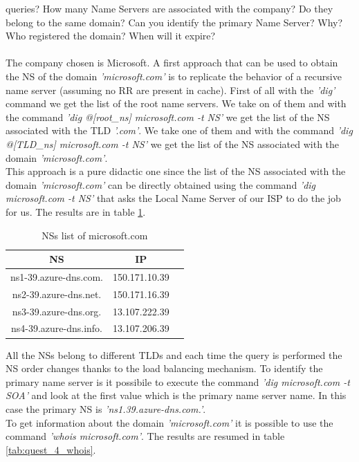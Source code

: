 \documentclass[a4paper,10pt]{article}
\begin{document}
\begin{multicols}{2}
queries? How many Name Servers are associated with the company? Do they belong to the same domain? Can you identify the primary Name Server? Why?
Who registered the domain? When will it expire?\\
\\
The company chosen is Microsoft. A first approach that can be used to obtain the NS of the domain \textit{'microsoft.com'} is to replicate the behavior of a 
recursive name server (assuming no RR are present in cache). First of all with the \textit{'dig'} command we get the list of the root name servers. We take on of them and with the command \textit{'dig @[root\_ns] microsoft.com -t NS'}
we get the list of the NS associated with the TLD \textit{'.com'}. We take one of them and with the command \textit{'dig @[TLD\_ns] microsoft.com -t NS'} we get the list of the NS associated with
the domain \textit{'microsoft.com'}.\\
This approach is a pure didactic one since the list of the NS associated with the domain \textit{'microsoft.com'} can be directly obtained using the command \textit{'dig microsoft.com -t NS'} that 
asks the Local Name Server of our ISP to do the job for us. The results are in table \ref{tab:quest_4}.

        \begin{table}[H]
                \centering
                \caption{\small NSs list of microsoft.com}
                \vspace{0.3cm}
                \begin{tabular}{|c|c|c|}
                \hline
                \textbf{NS} & \textbf{IP} \\ \hline
                ns1-39.azure-dns.com. & 150.171.10.39 \\ \hline
	        ns2-39.azure-dns.net. & 150.171.16.39 \\ \hline
                ns3-39.azure-dns.org. & 13.107.222.39 \\ \hline
                ns4-39.azure-dns.info. & 13.107.206.39 \\ \hline
                \end{tabular}
                \label{tab:quest_4}
        \end{table}
\noindent
All the NSs belong to different TLDs and each time the query is performed the NS order changes thanks to the load balancing mechanism. To identify the primary name server is it possibile
to execute the command \textit{'dig microsoft.com -t SOA'} and look at the first value which is the primary name server name. In this case the primary NS is \textit{'ns1.39.azure-dns.com.'}.\\
To get information about the domain \textit{'microsoft.com'} it is possible to use the command \textit{'whois microsoft.com'}. The results are resumed in table \ref{tab:quest_4_whois}.


\end{multicols}
\end{document}
